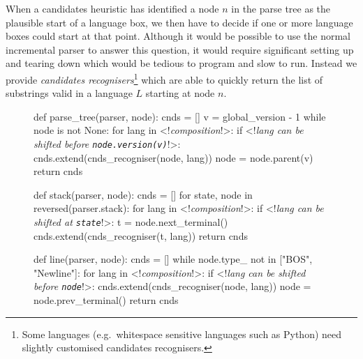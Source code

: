 \documentclass[sigplan,screen]{acmart}
\begin{document}
When a candidates heuristic has identified a node $n$ in the parse tree as the
plausible start of a language box, we then have to decide if one or more
language boxes could start at that point. Although it would be possible to use
the normal incremental parser to answer this question, it would require
significant setting up and tearing down which would be tedious to program and
slow to run. Instead we provide \emph{candidates recognisers}\footnote{Some languages
(e.g.~whitespace sensitive languages such as Python) need slightly customised
candidates recognisers.} which are able to quickly return the list of substrings valid in
a language $L$ starting at node $n$.

\begin{figure}[t]
\begin{minipage}[t]{0.5\textwidth}
\begin{lstdefault}[]
def parse_tree(parser, node):
  cnds = []
  v = global_version - 1
  while node is not None:
    for lang in <!\textrm{\textit{composition}}!>:
      if <!\textrm{\textit{lang can be shifted before \texttt{node.version(v)}}}!>:
        cnds.extend(cnds_recogniser(node, lang))
    node = node.parent(v)
  return cnds

def stack(parser, node):
  cnds = []
  for state, node in reversed(parser.stack):
    for lang in <!\textrm{\textit{composition}}!>:
      if <!\textrm{\textit{lang can be shifted at \texttt{state}}}!>:
        t = node.next_terminal()
        cnds.extend(cnds_recogniser(t, lang))
  return cnds
\end{lstdefault}
\end{minipage}
\begin{minipage}[t]{0.48\textwidth}
\begin{lstdefault}[firstnumber=19]
def line(parser, node):
  cnds = []
  while node.type_ not in ["BOS", "Newline"]:
    for lang in <!\textrm{\textit{composition}}!>:
      if <!\textrm{\textit{lang can be shifted before \texttt{node}}}!>:
        cnds.extend(cnds_recogniser(node, lang))
    node = node.prev_terminal()
  return cnds
\end{lstdefault}
\end{minipage}


\end{figure}
\end{document}
